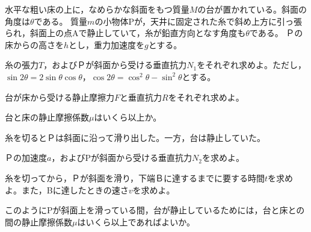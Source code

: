 \item
\begin{mawarikomi}{150pt}{}
    水平な粗い床の上に，なめらかな斜面をもつ質量$M$の台が置かれている。斜面の角度は$\theta $である。
    質量$m$の小物体Pが，天井に固定された糸で斜め上方に引っ張られ，斜面上の点Aで静止していて，糸が鉛直方向となす角度も$\theta $である。
    Ｐの床からの高さを$h$とし，重力加速度を$g$とする。
    \begin{Enumerate}
        \item 糸の張力$T$，およびＰが斜面から受ける垂直抗力$N_1$をそれぞれ求めよ。ただし，$\sin{2\theta }=2\sin{\theta }\cos{\theta }$，$\cos{2\theta}=\cos^2{\theta}-\sin^2{\theta}$とする。
        \item 台が床から受ける静止摩擦力$F$と垂直抗力$R$をそれぞれ求めよ。
        \item 台と床の静止摩擦係数$\mu $はいくら以上か。
    \end{Enumerate}
    糸を切るとＰは斜面に沿って滑り出した。一方，台は静止していた。
    \begin{Enumerate*}
        \item Ｐの加速度$a$，およびPが斜面から受ける垂直抗力$N_2$を求めよ。
        \item 糸を切ってから，Ｐが斜面を滑り，下端Ｂに達するまでに要する時間$t$を求めよ。また，Bに達したときの速さ$v$を求めよ。
        \item このようにPが斜面上を滑っている間，台が静止しているためには，台と床との間の静止摩擦係数$\mu $はいくら以上であればよいか。
    \end{Enumerate*}
\end{mawarikomi}

